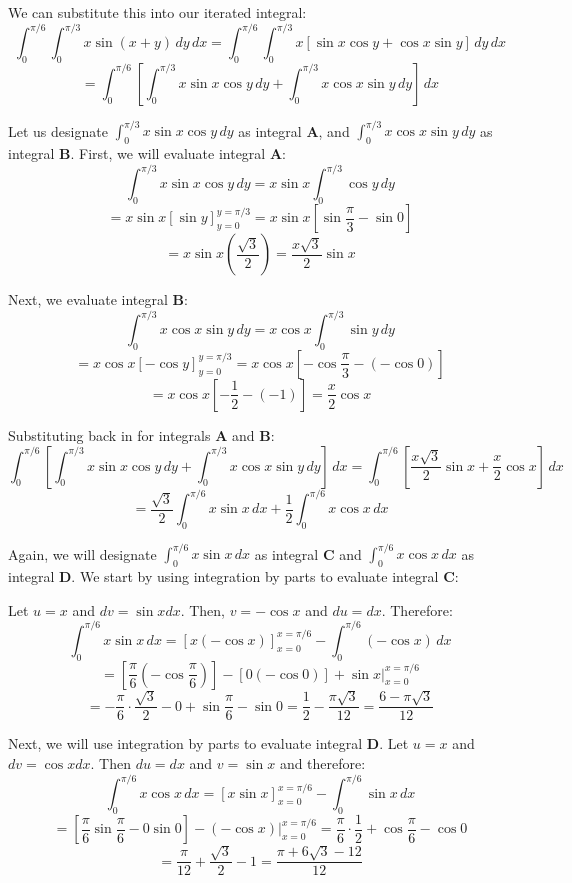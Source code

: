 \begin{Answer}[ref = fubini_2]
\begin{enumerate}
We can substitute this into our iterated integral:
$$\int_0^{\pi/6} \int_0^{\pi/3} x \sin{ \left( x + y \right) }\,dy\,dx = 
\int_0^{\pi/6} \int_0^{\pi/3} x \left[ \sin{x}\cos{y} + \cos{x}\sin{y} 
\right]\,dy\,dx$$
$$= \int_0^{\pi/6} \left[ \int_0^{\pi/3} x \sin{x} \cos{y}\,dy + \int_0^{\pi/3}
x \cos{x} \sin{y}\,dy \right]\,dx$$

Let us designate $\int_0^{\pi/3} x \sin{x} \cos{y}\,dy$ as integral \textbf{A}, 
and $\int_0^{\pi/3} x \cos{x} \sin{y}\,dy$ as integral \textbf{B}. First, we 
will evaluate integral \textbf{A}:
$$\int_0^{\pi/3} x \sin{x} \cos{y}\,dy = x \sin{x} \int_0^{\pi/3} \cos{y}\,dy$$
$$= x \sin{x} \left[ \sin{y} \right]_{y = 0}^{y = \pi/3} = x \sin{x} \left[ 
\sin{\frac{\pi}{3}} - \sin{0} \right]$$
$$= x \sin{x} \left( \frac{\sqrt{3}}{2} \right) = \frac{x \sqrt{3}}{2} \sin{x}$$

Next, we evaluate integral \textbf{B}:
$$\int_0^{\pi/3} x \cos{x} \sin{y}\,dy = x \cos{x} \int_0^{\pi/3} \sin{y}\,dy$$
$$= x \cos{x} \left[ - \cos{y} \right]_{y = 0}^{y = \pi/3} = x \cos{x} \left[ -
\cos{\frac{\pi}{3}} - \left( - \cos{0} \right) \right]$$
$$= x\cos{x} \left[ - \frac{1}{2} - (-1) \right] = \frac{x}{2}\cos{x}$$

Substituting back in for integrals \textbf{A} and \textbf{B}:
$$\int_0^{\pi/6} \left[ \int_0^{\pi/3} x \sin{x} \cos{y}\,dy + \int_0^{\pi/3} 
x \cos{x} \sin{y}\,dy \right]\,dx = \int_0^{\pi/6} \left[ \frac{x \sqrt{3}}{2} 
\sin{x} + \frac{x}{2}\cos{x} \right]\,dx$$
$$= \frac{\sqrt{3}}{2} \int_0^{\pi/6} x \sin{x}\,dx + \frac{1}{2} \int_0^{
\pi/6} x \cos{x}\,dx$$

Again, we will designate $\int_0^{\pi/6} x \sin{x}\,dx$ as integral \textbf{C} 
and $\int_0^{\pi/6} x \cos{x}\,dx$ as integral \textbf{D}. We start by using 
integration by parts to evaluate integral \textbf{C}:

Let $u = x$ and $dv = \sin{x} dx$. Then, $v = -\cos{x}$ and $du = dx$. Therefore:
$$\int_0^{\pi/6} x \sin{x}\,dx = \left[ x \left(- \cos{x} \right) \right]_{x = 
0}^{x = \pi/6} - \int_0^{\pi/6} \left( - \cos{x} \right)\,dx$$
$$= \left[ \frac{\pi}{6} \left(- \cos{\frac{\pi}{6}} \right) \right] - \left[ 
0 \left(- \cos{0} \right) \right] + \sin{x}|_{x = 0}^{x = \pi/6}$$
$$= -\frac{\pi}{6} \cdot \frac{\sqrt{3}}{2} - 0 + \sin{\frac{\pi}{6}} - 
\sin{0} = \frac{1}{2} - \frac{\pi \sqrt{3}}{12} = \frac{6 - \pi \sqrt{3}}{12}$$

Next, we will use integration by parts to evaluate integral \textbf{D}. Let $u 
= x$ and $dv = \cos{x} dx$. Then $du = dx$ and $v = \sin{x}$ and therefore:
$$\int_0^{\pi/6} x \cos{x}\,dx = \left[ x \sin{x} \right]_{x = 0}^{x = \pi/6} -
\int_0^{\pi/6} \sin{x}\,dx$$
$$= \left[ \frac{\pi}{6}\sin{\frac{\pi}{6}} - 0\sin{0} \right] - \left( - 
\cos{x} \right)|_{x = 0}^{x = \pi/6} = \frac{\pi}{6} \cdot \frac{1}{2} + 
\cos{\frac{\pi}{6}} - \cos{0}$$
$$= \frac{\pi}{12} + \frac{\sqrt{3}}{2} - 1 = \frac{\pi + 6\sqrt{3} - 12}{12}$$


\end{enumerate}
\end{Answer}
